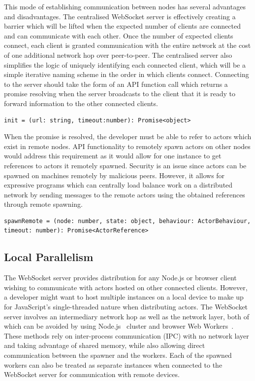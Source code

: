 \documentclass[oneside]{um-fict}
\begin{document}
This mode of establishing communication between nodes has several advantages and disadvantages. The centralised WebSocket server is effectively creating a barrier which will be lifted when the expected number of clients are connected and can communicate with each other. Once the number of expected clients connect, each client is granted communication with the entire network at the cost of one additional network hop over peer-to-peer. The centralised server also simplifies the logic of uniquely identifying each connected client, which will be a simple iterative naming scheme in the order in which clients connect. Connecting to the server should take the form of an API function call which returns a promise resolving when the server broadcasts to the client that it is ready to forward information to the other connected clients.
\begin{lstlisting}
init = (url: string, timeout:number): Promise<object>
\end{lstlisting}
When the promise is resolved, the developer must be able to refer to actors which exist in remote nodes. API functionality to remotely spawn actors on other nodes would address this requirement as it would allow for one instance to get references to actors it remotely spawned. Security is an issue since actors can be spawned on machines remotely by malicious peers. However, it allows for expressive programs which can centrally load balance work on a distributed network by sending messages to the remote actors using the obtained references through remote spawning.
\begin{lstlisting}
spawnRemote = (node: number, state: object, behaviour: ActorBehaviour, timeout: number): Promise<ActorReference>
\end{lstlisting}
\subsection{Local Parallelism}
The WebSocket server provides distribution for any Node.js or browser client wishing to communicate with actors hosted on other connected clients. However, a developer might want to host multiple instances on a local device to make up for JavaScript's single-threaded nature when distributing actors. The WebSocket server involves an intermediary network hop as well as the network layer, both of which can be avoided by using Node.js~\cite{nodejs} cluster and browser Web Workers~\cite{webworkers}. These methods rely on inter-process communication (IPC) with no network layer and taking advantage of shared memory, while also allowing direct communication between the spawner and the workers. Each of the spawned workers can also be treated as separate instances when connected to the WebSocket server for communication with remote devices.
\end{document}
